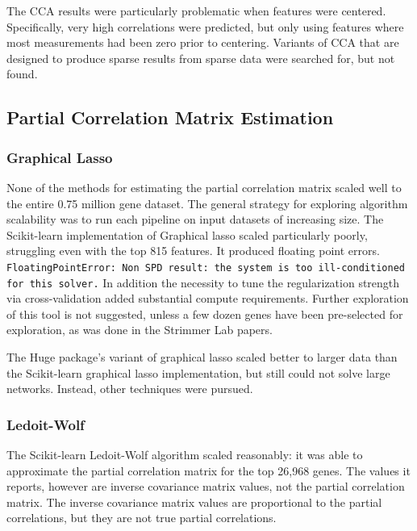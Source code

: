 The CCA results were particularly problematic when features were centered.
Specifically, very high correlations were predicted, but only using features where most measurements had been zero prior to centering.
Variants of CCA that are designed to produce sparse results from sparse data were searched for, but not found.

\subsection{Partial Correlation Matrix Estimation}

\subsubsection{Graphical Lasso}
None of the methods for estimating the partial correlation matrix scaled well to the entire 0.75 million gene dataset.
The general strategy for exploring algorithm scalability was to run each pipeline on input datasets of increasing size.
The Scikit-learn implementation of Graphical lasso scaled particularly poorly, struggling even with the top 815 features.
It produced floating point errors. %
\texttt{FloatingPointError: Non SPD result: the system is too ill-conditioned for this solver.} %
In addition the necessity to tune the regularization strength via cross-validation added substantial compute requirements.
Further exploration of this tool is not suggested, unless a few dozen genes have been pre-selected for exploration, as was done in the Strimmer Lab papers.

The Huge package's variant of graphical lasso scaled better to larger data than the Scikit-learn graphical lasso implementation, but still could not solve large networks.
Instead, other techniques were pursued.

\subsubsection{Ledoit-Wolf}
The Scikit-learn Ledoit-Wolf algorithm scaled reasonably: it was able to approximate the partial correlation matrix for the top 26,968 genes.
The values it reports, however are inverse covariance matrix values, not the partial correlation matrix.
The inverse covariance matrix values are proportional to the partial correlations, but they are not true partial correlations.

